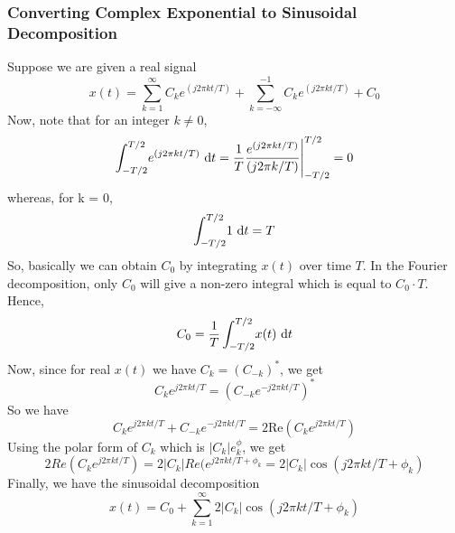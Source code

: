 \subsubsection{Converting Complex Exponential to Sinusoidal Decomposition}
Suppose we are given a real signal
\begin{equation*}
	x(t) = \sum_{k=1}^{\infty}{C_{k}e^{(j2\pi kt/T)}} + \sum_{k=-\infty}^{-1}{C_{k}e^{(j2\pi kt/T)}} + C_{0} 	
\end{equation*}
Now, note that for an integer $k \neq 0$,
\begin{equation*}
	\int_{-T/2}^{T/2} \! e^{(j2\pi kt/T)} \ \mathrm{d} t = \frac{1}{T}\frac{e^{(j2\pi kt/T)}}{(j2\pi k/T)}\Bigg|_{-T/2}^{T/2} = 0	
\end{equation*}
whereas, for k = 0, $$\int_{-T/2}^{T/2} \! 1 \ \mathrm{d} t = T$$
So, basically we can obtain $C_{0}$ by integrating $x(t)$ over time $T$. In the Fourier decomposition, only $C_{0}$ will give a non-zero integral which is equal to $C_{0}\cdot T$.
Hence,
\begin{equation*}
	C_{0} = \frac{1}{T}\int_{-T/2}^{T/2} \! x(t) \ \mathrm{d} t
\end{equation*}
Now, since for real $x(t)$ we have $C_{k} = (C_{-k})^{*}$, we get
\begin{equation*}
	C_{k}e^{j2\pi kt/T} = (C_{-k}e^{-j2\pi kt/T})^{*}	
\end{equation*}
So we have 
\begin{equation*}
	C_{k}e^{j2\pi kt/T} + C_{-k}e^{-j2\pi kt/T} = 2 \text{Re} (C_{k}e^{j2\pi kt/T})	
\end{equation*}
Using the polar form of $C_{k}$ which is $|{C_{k}}|e^\phi_{k}$, we get
\begin{equation*}
 	2 Re (C_{k}e^{j2\pi kt/T}) =  2|{C_{k}}|Re(e^{j2\pi kt/T + \phi_{k}} = 2|{C_{k}}|\cos(j2\pi kt/T + \phi_{k})
\end{equation*}
Finally, we have the sinusoidal decomposition
\begin{equation*}
	x(t) = C_{0} + \sum_{k=1}^{\infty}2|{C_{k}}|\cos(j2\pi kt/T + \phi_{k})
\end{equation*}
